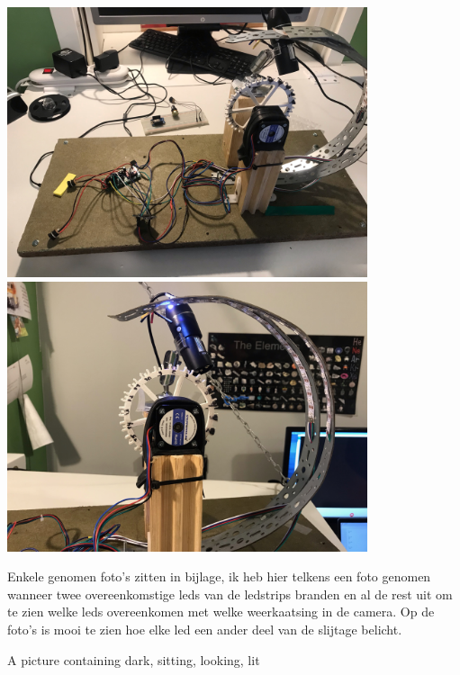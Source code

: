 \documentclass{article}
\begin{document}
\includegraphics[width=4.166667in, keepaspectratio=true]{./ZimFiles_files/Verslagen/Activiteiten_rapport/Activities/Masterproef_Tool_Wear_Inspection_-_Update_3_DH/rechts_kabels.jpeg}\includegraphics[width=4.166667in, keepaspectratio=true]{./ZimFiles_files/Verslagen/Activiteiten_rapport/Activities/Masterproef_Tool_Wear_Inspection_-_Update_3_DH/rechts.jpeg}

 

Enkele genomen foto’s zitten in bijlage, ik heb hier telkens een foto genomen wanneer twee overeenkomstige leds van de ledstrips branden en al de rest uit om te zien welke leds overeenkomen met welke weerkaatsing in de camera. Op de foto’s is mooi te zien hoe elke led een ander deel van de slijtage belicht.

A picture containing dark, sitting, looking, lit
\end{document}
